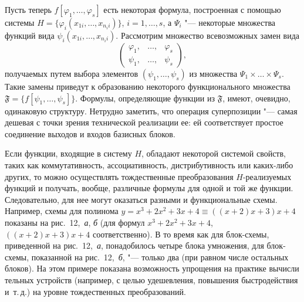 Пусть теперь $f[\varphi_1,\dots,\varphi_s]$ есть некоторая формула,
построенная с помощью системы
$H=\{\varphi_i(x_{1i},\dots,x_{n_ii})\}$, $i=1,\dots,s$, а $\Psi_i$ "---
некоторые множества функций вида $\psi_i(x_{1i},\dots,x_{n_ii})$.
Рассмотрим множество всевозможных замен вида
\begin{equation}\tag{1.18}
\begin{pmatrix}\varphi_1, & \dots, & \varphi_s\\ \psi_1, & \dots, & \psi_s\end{pmatrix},
\end{equation}
получаемых путем выбора элементов $(\psi_1,\dots,\psi_s)$ из множества
$\Psi_1\times\dots\times\Psi_s$. Такие замены приведут к образованию
некоторого
%
функционального множества $\mathfrak F=\{f[\psi_1,\dots,\psi_s]\}$.
Формулы, определяющие функции из $\mathfrak F$, имеют, очевидно, одинаковую
структуру. Нетрудно заметить, что операция суперпозиции "--- самая дешевая
с точки зрения технической реализации ее: ей соответствует простое
соединение выходов и входов базисных блоков.

Если функции, входящие в систему $H$, обладают некоторой системой свойств,
таких как коммутативность, ассоциативность, дистрибутивность или
каких-либо других, то можно осуществлять тождественные преобразования
$H$-реализуемых функций и получать, вообще, различные формулы для одной
и той же функции. Следовательно, для нее могут оказаться разными
и функциональные схемы. Например, схемы для полинома
$y=x^3+2x^2+3x+4\equiv((x+2)x+3)x+4$ показаны на рис.~12,~\emph{а},
\emph{б} (для
формул $x^3+2x^2+3x+4$, $((x+2)x+3)x+4$
соответственно).
В то время как для блок-схемы, приведенной на рис.~12,~\emph{а}, понадобилось
четыре блока умножения, для блок-схемы, показанной на рис.~12,~\emph{б},
"--- только два (при равном числе остальных блоков). На этом примере
показана возможность упрощения на практике вычисли\-%
%
тельных устройств (например, с целью удешевления, повышения быстродействия
и~т.\,д.) на уровне тождественных преобразований.

